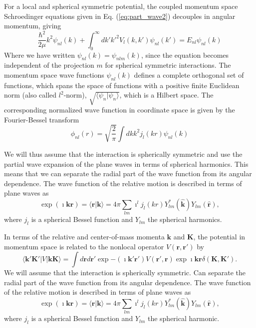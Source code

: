 \documentclass[%
oneside,                 %
final,                   %
10pt]{article}
\begin{document}
For a local and spherical symmetric potential, 
the coupled momentum space Schroedinger equations given in Eq. (\ref{eq:part_wave2})
decouples in angular momentum, 
giving
\begin{equation}
\frac{\hbar^2}{2\mu} k^2 \psi_{n l}(k) +\int_{0}^\infty dk' {k'}^2 V_{l}(k,k') \psi_{n l }(k')=E_{n l} \psi_{n l}(k) 
  \label{eq:momentum_space}
\end{equation}   
Where we have written $\psi_{n l }(k)=\psi_{nlm}(k)$, since the 
equation becomes independent of the projection $m$ for spherical symmetric interactions. 
The momentum space wave functions $\psi_{n l}(k)$ defines a complete orthogonal set 
of functions, which spans the space of functions with a positive finite Euclidean norm 
 (also called $l^2$-norm), $\sqrt{\langle\psi_n\vert\psi_n\rangle}$, which 
is a Hilbert space. The corresponding normalized wave function in coordinate space
is given by the Fourier-Bessel transform 
\[
  \phi_{n l}(r)  = \sqrt{\frac{2}{\pi}}\int dk k^2 j_l(kr) \psi_{n l}(k)
\]    

We will thus assume that the interaction is spherically symmetric and use
the partial wave expansion of the plane waves in
terms of spherical harmonics.
This means that we can separate the radial part of the wave function from its
angular dependence. The wave function of the relative motion is described
in terms of plane waves as
\[
\exp{(\imath \mathbf{kr})}=\langle\mathbf{r}\vert\mathbf{k}\rangle=4\pi\sum_{lm}\imath^{l}j_{l}(kr)Y_{lm}^{*}(\mathbf{\hat{k}})Y_{lm}(\mathbf{\hat{r}}),
\]
where $j_l$ is a spherical Bessel function and $Y_{lm}$ the
spherical harmonics.

In terms of the relative and center-of-mass momenta $\mathbf{k}$ and
$\mathbf{K}$, the potential in momentum space is related to the nonlocal operator
$V(\mathbf{r},\mathbf{r}')$ by
\[
\langle\mathbf{k'K'}\vert V \vert \mathbf{kK}\rangle =\int d\mathbf{r}d \mathbf{r'}
        \exp{-(\imath \mathbf{k'r'})}V(\mathbf{r'},\mathbf{r})\exp{\imath \mathbf{kr}}\delta(\mathbf{K},\mathbf{K'}).
\]
We will assume that the interaction is spherically symmetric.
Can separate the radial part of the wave function from its
angular dependence. The wave function of the relative motion is described
in terms of plane waves as
\[
\exp{(\imath \mathbf{kr})} =\langle\mathbf{r}\vert\mathbf{k}\rangle= 4\pi\sum_{lm}\imath^{l}j_{l}(kr)Y_{lm}^{*}(\mathbf{\hat{k}})Y_{lm}(\mathbf{\hat{r}}),
\]
where $j_l$ is a spherical Bessel function and $Y_{lm}$ the
spherical harmonic.
\end{document}

